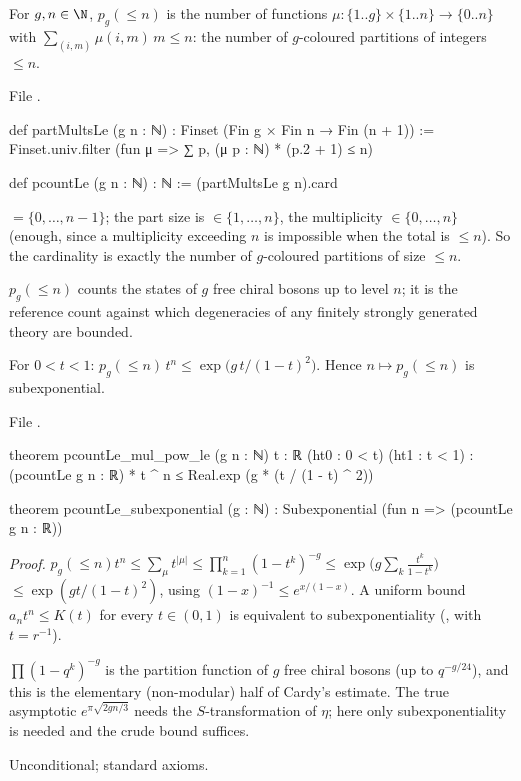 \begin{definition}\label{l14:def:pcount}
For $g,n\in\N$, $p_g(\le n)$ is the number of functions $\mu:\{1..g\}\times\{1..n\}\to\{0..n\}$ with
$\sum_{(i,m)}\mu(i,m)\,m\le n$: the number of $g$-coloured partitions of integers $\le n$.
\end{definition}
\noindent File .
\begin{leancode}
def partMultsLe (g n : ℕ) : Finset (Fin g × Fin n → Fin (n + 1)) :=
  Finset.univ.filter (fun μ => ∑ p, (μ p : ℕ) * (p.2 + 1) ≤ n)

def pcountLe (g n : ℕ) : ℕ := (partMultsLe g n).card
\end{leancode}
\begin{dictionary}
 $=\{0,\dots,n-1\}$; the part size is  $\in\{1,\dots,n\}$, the multiplicity 
$\in\{0,\dots,n\}$ (enough, since a multiplicity exceeding $n$ is impossible when the total is $\le n$). So the cardinality is
exactly the number of $g$-coloured partitions of size $\le n$.
\end{dictionary}
\begin{physics}
$p_g(\le n)$ counts the states of $g$ free chiral bosons up to level $n$; it is the reference count against which degeneracies of any finitely strongly generated theory are bounded.
\end{physics}

\begin{theorem}\label{l14:thm:pcount}
For $0<t<1$: $p_g(\le n)\,t^n\le\exp\!\bigl(g\,t/(1-t)^2\bigr)$. Hence $n\mapsto p_g(\le n)$ is subexponential.
\end{theorem}
\noindent File .
\begin{leancode}
theorem pcountLe_mul_pow_le (g n : ℕ) {t : ℝ} (ht0 : 0 < t) (ht1 : t < 1) :
    (pcountLe g n : ℝ) * t ^ n ≤ Real.exp (g * (t / (1 - t) ^ 2))

theorem pcountLe_subexponential (g : ℕ) : Subexponential (fun n => (pcountLe g n : ℝ))
\end{leancode}
\noindent\emph{Proof.} $p_g(\le n)t^n\le\sum_\mu t^{|\mu|}\le\prod_{k=1}^n(1-t^k)^{-g}\le\exp\bigl(g\sum_k\frac{t^k}{1-t^k}\bigr)$
$\le\exp(gt/(1-t)^2)$, using $(1-x)^{-1}\le e^{x/(1-x)}$. A uniform bound $a_nt^n\le K(t)$ for every $t\in(0,1)$ is equivalent
to subexponentiality (, with $t = r^{-1}$).
\begin{physics}
$\prod(1-q^k)^{-g}$ is the partition function of $g$ free chiral bosons (up to $q^{-g/24}$), and this is the elementary
(non-modular) half of Cardy's estimate. The true asymptotic $e^{\pi\sqrt{2gn/3}}$ needs the $S$-transformation of $\eta$;
here only subexponentiality is needed and the crude bound suffices.
\end{physics}
\begin{status}
Unconditional; standard axioms.
\end{status}

